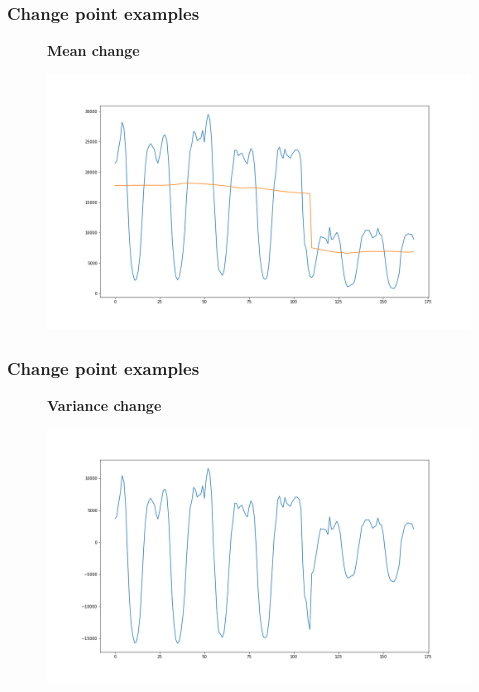 \documentclass[intlimits, 9pt, unicode]{beamer}
\begin{document}
\begin{frame}
\frametitle{Change point examples}
\begin{figure}
\textbf{Mean change}\par\medskip
\includegraphics[scale=0.30]{images/002_mean}
\end{figure}
\end{frame}

\begin{frame}
\frametitle{Change point examples}
\begin{figure}
\textbf{Variance change}\par\medskip
\includegraphics[scale=0.30]{images/003_variance}
\end{figure}
\end{frame}
\end{document}
